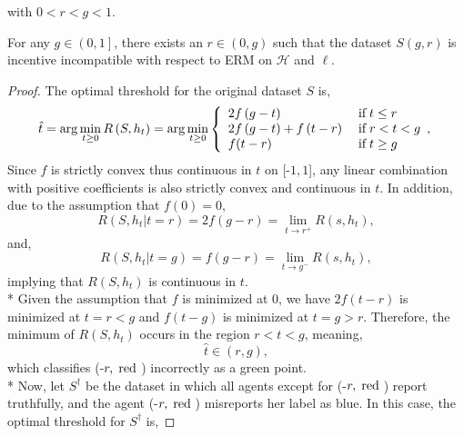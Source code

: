 \documentclass{article}
\begin{document}
with $0 < r < g < 1$.
\newline \newline
\begin{prop} \label{prop:ex1} 
For any $g  \in \left(0, 1\right]$, there exists an $r  \in \left(0, g\right)$ such that the dataset $S\left(g, r \right) $ is incentive incompatible with respect to ERM on $\mathcal{H}$ and $\ell$.
\end{prop}
\begin{proof} \label{proof:ex1pf} 
The optimal threshold for the original dataset $S $ is,
\begin{equation} \hat{t} = \arg\displaystyle\min_{t \geq  0} R\left(S, h_{t}\right) = \arg\displaystyle\min_{t \geq  0}\left\{ \begin{array}{ll}
2 f\left(g - t\right)& \text{\;if\;} t \leq  r \\
2 f\left(g - t\right) + f\left(t - r\right)& \text{\;if\;} r < t < g \\
f(t - r)& \text{\;if\;} t \geq  g \\
\end{array},\right. \end{equation}
Since $f $ is strictly convex thus continuous in $t $ on [-$1, 1$], any linear combination with positive coefficients is also strictly convex and continuous in $t $. In addition, due to the assumption that $f\left(0\right)  = 0$,
\begin{equation} 
R\left(S, h_{t} | t = r\right)  = 2 f\left(g - r\right) = \lim_{t \to  r^{+}} R\left(s, h_{t}\right),
\end{equation}
and,
\begin{equation} 
R\left(S, h_{t} | t = g\right)  = f\left(g - r\right) = \lim_{t \to  g^{-}} R\left(s, h_{t}\right),
\end{equation}
implying that $R\left(S, h_{t}\right) $ is continuous in $t. $
\\* Given the assumption that $f $ is minimized at $0$, we have $2 f\left(t - r\right) $ is minimized at $t  = r < g$ and $f\left(t - g\right) $ is minimized at $t  = g > r$. Therefore, the minimum of $R\left(S, h_{t}\right) $ occurs in the region $r  < t < g $, meaning,
\begin{equation} 
\hat{t} \in \left(r , g \right),
\end{equation}
which classifies (-$r , \text{\;red\;}$) incorrectly as a green point.
\\* Now, let $S^{\dagger}$ be the dataset in which all agents except for (-$r , \text{\;red\;}$) report truthfully, and the agent (-$r , \text{\;red\;}$) misreports her label as blue. In this case, the optimal threshold for $S^{\dagger}$ is,

\end{proof}
\end{document}

